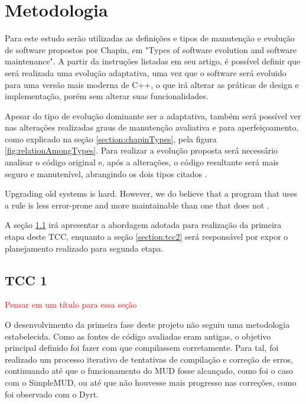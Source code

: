 \chapter[Metodologia]{Metodologia}
\label{chapter:metodologia}

Para este estudo serão utilizadas as definições e tipos de manutenção e evolução de software 
propostos por Chapin, em "Types of software evolution and software maintenance". 
A partir da instruções listadas em seu artigo, é possível definir que será realizada uma evolução 
adaptativa, uma vez que o software será evoluido para uma versão mais moderna de C++, o que irá 
alterar as práticas de design e implementação, porém sem alterar suas funcionalidades.

Apesar do tipo de evolução dominante ser a adaptativa, também será possível ver nas alterações realizadas 
graus de manutenção avaliativa e para aperfeiçoamento, como explicado na seção \ref{section:chapinTypes}, 
pela figura \ref{fig:relationAmongTypes}. Para realizar a evolução proposta será necessário analisar o 
código original e, após a alterações, o código resultante será mais seguro e manutenível, abrangindo 
os dois tipos citados \cite{chapin2001types}.

\begin{citacao}
    Upgrading old systems is hard. However, we do believe that a program that uses a rule is less error-prone and more maintainable than one that does not \cite{stroustrup2022c++}.
\end{citacao}

A seção \ref{section:tcc1} irá apresentar a abordagem adotada para realização da primeira etapa deste TCC, 
enquanto a seção \ref{section:tcc2} será responsável por expor o planejamento realizado para segunda etapa.

\section{TCC 1}
\label{section:tcc1}

\textcolor{red}{Pensar em um título para essa seção}

O desenvolvimento da primeira fase deste projeto não seguiu uma metodologia estabelecida. Como as fontes 
de código avaliadas eram antigas, o objetivo principal definido foi fazer com que compilassem 
corretamente. Para tal, foi realizado um processo iterativo de tentativas de compilação e correção de 
erros, continuando até que o funcionamento do MUD fosse alcançado, como foi o caso com o SimpleMUD, ou 
até que não houvesse mais progresso nas correções, como foi observado com o Dyrt.

